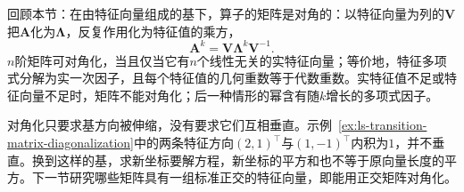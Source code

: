 回顾本节：在由特征向量组成的基下，算子的矩阵是对角的：以特征向量为列的$\bm V$把$\bm A$化为$\bm\Lambda$，反复作用化为特征值的乘方，
\[
 \bm A^k=\bm V\bm\Lambda^k\bm V^{-1}.
\]
$n$阶矩阵可对角化，当且仅当它有$n$个线性无关的实特征向量；等价地，特征多项式分解为实一次因子，且每个特征值的几何重数等于代数重数。实特征值不足或特征向量不足时，矩阵不能对角化；后一种情形的幂含有随$k$增长的多项式因子。

对角化只要求基方向被伸缩，没有要求它们互相垂直。示例~\ref{ex:ls-transition-matrix-diagonalization}中的两条特征方向$(2,1)^{\top}$与$(1,-1)^{\top}$内积为$1$，并不垂直。换到这样的基，求新坐标要解方程，新坐标的平方和也不等于原向量长度的平方。下一节研究哪些矩阵具有一组标准正交的特征向量，即能用正交矩阵对角化。
